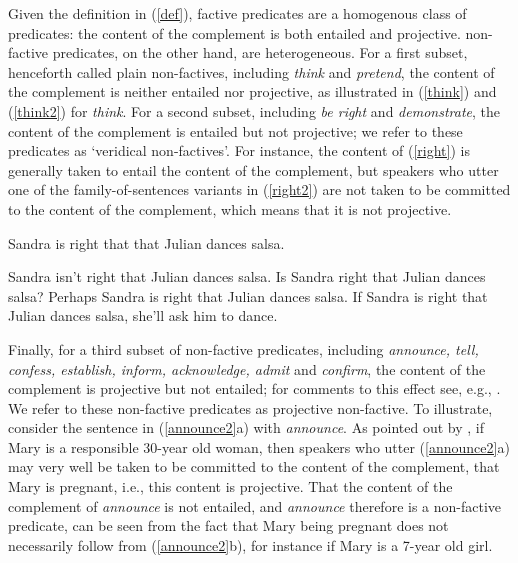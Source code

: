 \documentclass[11pt,fleqn]{article}
\newcommand{\6}{\mbox{$[\hspace*{-.6mm}[$}}
\newcommand{\9}{\mbox{$]\hspace*{-.6mm}]$}}
\begin{document}
Given the definition in (\ref{def}), factive predicates are a homogenous class of predicates: the content of the complement is both entailed and projective. non-factive predicates, on the other hand, are heterogeneous. For a first subset, henceforth called plain non-factives, including {\em think} and {\em pretend}, the content of the complement is neither entailed nor projective, as illustrated in (\ref{think}) and (\ref{think2}) for {\em think}. For a second subset, including {\em be right} and {\em demonstrate}, the content of the complement is entailed but not projective; we refer to these predicates as `veridical non-factives'. For instance, the content of (\ref{right}) is generally taken to entail the content of the complement, but speakers who utter one of the family-of-sentences variants in (\ref{right2}) are not taken to be committed to the content of the complement, which means that it is not projective. 

\begin{exe}
\ex\label{right} Sandra is right that that Julian dances salsa.
\ex\label{right2} 

\begin{xlist} 
\ex Sandra isn't right that Julian dances salsa. 
\ex Is Sandra right that Julian dances salsa?
\ex Perhaps Sandra is right that Julian dances salsa.
\ex If Sandra is right that Julian dances salsa, she'll ask him to dance. 
\end{xlist}
\end{exe}
Finally, for a third subset of non-factive predicates, including {\em announce, tell, confess, establish, inform, acknowledge, admit} and {\em confirm}, the content of the complement is projective but not entailed; for comments to this effect see, e.g., \citealt{reis1973,melvold1991,schultz2003,swanson2012,anand-hacquard2014,spector-egre2015,karttunen2016,tbd-variability}.  We refer to these non-factive predicates as projective non-factive. To illustrate, consider the sentence in (\ref{announce2}a) with {\em announce}. As pointed out by \citet[139]{schlenker10}, if Mary is a responsible 30-year old woman, then speakers who utter (\ref{announce2}a) may very well be taken to be committed to the content of the complement, that Mary is pregnant, i.e., this content is projective. That the content of the complement of {\em announce} is not entailed, and {\em announce} therefore is a non-factive predicate, can be seen from the fact that Mary being pregnant does not necessarily follow from (\ref{announce2}b), for instance if Mary is a 7-year old girl.
\end{document}
